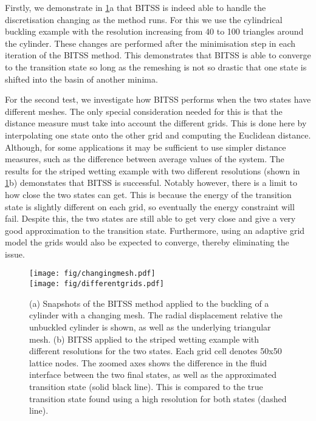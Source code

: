 \documentclass[aps,prl,twocolumn,groupedaddress]{revtex4}
\begin{document}
\topic Firstly, we demonstrate in \cref{fig:adaptivemesh}a that BITSS is indeed able to handle the discretisation changing as the method runs.
For this we use the cylindrical buckling example with the resolution increasing from 40 to 100 triangles around the cylinder.
These changes are performed after the minimisation step in each iteration of the BITSS method.
This demonstrates that BITSS is able to converge to the transition state so long as the remeshing is not so drastic that one state is shifted into the basin of another minima.

\topic For the second test, we investigate how BITSS performs when the two states have different meshes.
The only special consideration needed for this is that the distance measure must take into account the different grids.
This is done here by interpolating one state onto the other grid and computing the Euclidean distance.
Although, for some applications it may be sufficient to use simpler distance measures, such as the difference between average values of the system.
The results for the striped wetting example with two different resolutions (shown in \cref{fig:adaptivemesh}b) demonstates that BITSS is successful.
Notably however, there is a limit to how close the two states can get.
This is because the energy of the transition state is slightly different on each grid, so eventually the energy constraint will fail.
Despite this, the two states are still able to get very close and give a very good approximation to the transition state.
Furthermore, using an adaptive grid model the grids would also be expected to converge, thereby eliminating the issue.

\begin{figure}[tb]
  \texttt{[image: fig/changingmesh.pdf]}\\
  \texttt{[image: fig/differentgrids.pdf]}
  \caption{\label{fig:adaptivemesh}
    (a) Snapshots of the BITSS method applied to the buckling of a cylinder with a changing mesh.
        The radial displacement relative the unbuckled cylinder is shown, as well as the underlying triangular mesh.
    (b) BITSS applied to the striped wetting example with different resolutions for the two states.
        Each grid cell denotes 50x50 lattice nodes.
        The zoomed axes shows the difference in the fluid interface between the two final states, as well as the approximated transition state (solid black line).
        This is compared to the true transition state found using a high resolution for both states (dashed line).
  }
\end{figure}
\end{document}
